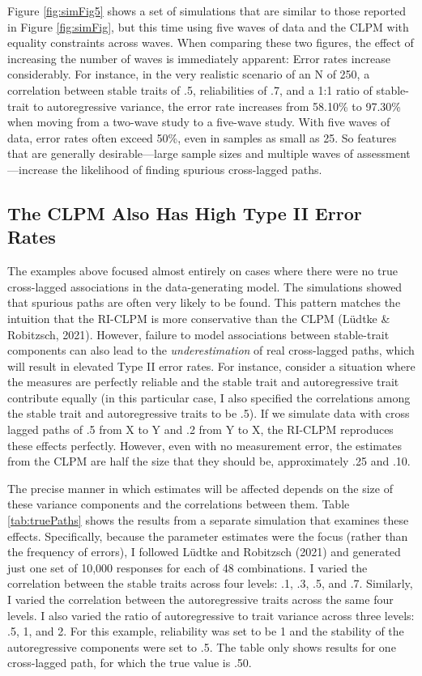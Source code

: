 \documentclass[
  english,
  man,floatsintext]{apa6}
\begin{document}
Figure \ref{fig:simFig5} shows a set of simulations that are similar to those reported in Figure \ref{fig:simFig}, but this time using five waves of data and the CLPM with equality constraints across waves. When comparing these two figures, the effect of increasing the number of waves is immediately apparent: Error rates increase considerably. For instance, in the very realistic scenario of an N of 250, a correlation between stable traits of .5, reliabilities of .7, and a 1:1 ratio of stable-trait to autoregressive variance, the error rate increases from 58.10\% to 97.30\% when moving from a two-wave study to a five-wave study. With five waves of data, error rates often exceed 50\%, even in samples as small as 25. So features that are generally desirable---large sample sizes and multiple waves of assessment---increase the likelihood of finding spurious cross-lagged paths.

\hypertarget{the-clpm-also-has-high-type-ii-error-rates}{%
\subsection{The CLPM Also Has High Type II Error Rates}\label{the-clpm-also-has-high-type-ii-error-rates}}

The examples above focused almost entirely on cases where there were no true cross-lagged associations in the data-generating model. The simulations showed that spurious paths are often very likely to be found. This pattern matches the intuition that the RI-CLPM is more conservative than the CLPM (Lüdtke \& Robitzsch, 2021). However, failure to model associations between stable-trait components can also lead to the \emph{underestimation} of real cross-lagged paths, which will result in elevated Type II error rates. For instance, consider a situation where the measures are perfectly reliable and the stable trait and autoregressive trait contribute equally (in this particular case, I also specified the correlations among the stable trait and autoregressive traits to be .5). If we simulate data with cross lagged paths of .5 from X to Y and .2 from Y to X, the RI-CLPM reproduces these effects perfectly. However, even with no measurement error, the estimates from the CLPM are half the size that they should be, approximately .25 and .10.

The precise manner in which estimates will be affected depends on the size of these variance components and the correlations between them. Table \ref{tab:truePaths} shows the results from a separate simulation that examines these effects. Specifically, because the parameter estimates were the focus (rather than the frequency of errors), I followed Lüdtke and Robitzsch (2021) and generated just one set of 10,000 responses for each of 48 combinations. I varied the correlation between the stable traits across four levels: .1, .3, .5, and .7. Similarly, I varied the correlation between the autoregressive traits across the same four levels. I also varied the ratio of autoregressive to trait variance across three levels: .5, 1, and 2. For this example, reliability was set to be 1 and the stability of the autoregressive components were set to .5. The table only shows results for one cross-lagged path, for which the true value is .50.
\end{document}
